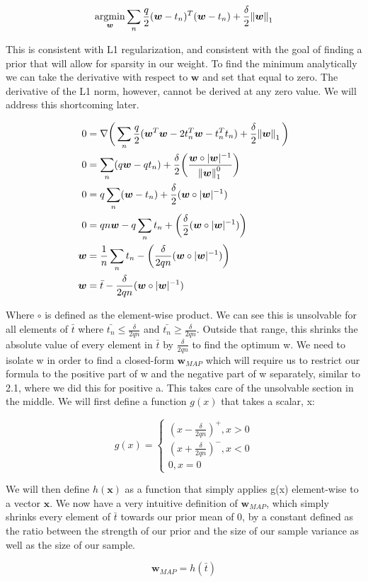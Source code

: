 \documentclass[a4paper,12pt]{article}
\DeclareMathOperator*{\argmin}{argmin}
\begin{document}
$$
\argmin_{\bm{w}} \sum_n \frac{q}{2}(\bm{w} - t_n)^{T}(\bm{w} - t_n) + \frac{\delta}{2} \norm{ \bm{w} }_1
$$

This is consistent with L1 regularization, and consistent with the goal of finding a prior that will allow for sparsity in our weight. To find the minimum analytically we can take the derivative with respect to $\bm{w}$ and set that equal to zero. The derivative of the L1 norm, however, cannot be derived at any zero value. We will address this shortcoming later.

\begin{align*}
0 &= \nabla \bigg(  \sum_n \frac{q}{2}(\bm{w}^T\bm{w} - 2t_n^T\bm{w} - t_n^Tt_n) + \frac{\delta}{2} \norm{ \bm{w} }_1  \bigg) \\
0 &=  \sum_n (q\bm{w} - qt_n) + \frac{\delta}{2} \bigg( \frac{\bm{w} \circ |\bm{w}|^{-1}}{ \norm{ \bm{w}}_1^{0} }  \bigg) \\ 
0 &=  q \sum_n (\bm{w} - t_n) + \frac{\delta}{2} ( \bm{w} \circ |\bm{w}|^{-1} ) \\
0 &=  qn\bm{w} - q\sum_n t_n + \bigg(\frac{\delta}{2} ( \bm{w} \circ |\bm{w}|^{-1} ) \bigg) \\
\bm{w} &=  \frac{1}{n} \sum_n t_n - \bigg( \frac{\delta}{2qn} ( \bm{w} \circ |\bm{w}|^{-1} ) \bigg) \\
  \bm{w} &=  \bar{t} - \frac{\delta}{2qn} ( \bm{w} \circ |\bm{w}|^{-1} )
\end{align*}

Where $\circ$ is defined as the element-wise product. We can see this is unsolvable for all elements of $\bar{t}$ where $\bar{t_n} \leq \frac{\delta}{2qn}$ and $\bar{t_n} \geq \frac{\delta}{2qn}$. Outside that range, this shrinks the absolute value of every element in $\bar{t}$ by $\frac{\delta}{2qn}$ to find the optimum w. We need to isolate w in order to find a closed-form $\bm{w}_{MAP}$ which will require us to restrict our formula to the positive part of w and the negative part of w separately, similar to 2.1, where we did this for positive a. This takes care of the unsolvable section in the middle. We will first define a function $ g(x) $ that takes a scalar, x:

$$
g(x) = 
\begin{cases}
  (x - \frac{\delta}{2qn})^+ , x > 0 \\
  (x + \frac{\delta}{2qn})^- , x < 0 \\
  0, x = 0
\end{cases}
$$

We will then define $h(\bm{x})$ as a function that simply applies g(x) element-wise to a vector $\bm{x}$. We now have a very intuitive definition of $\bm{w}_{MAP}$, which simply shrinks every element of $\bar{t}$ towards our prior mean of 0, by a constant defined as the ratio between the strength of our prior and the size of our sample variance as well as the size of our sample.

$$
  \bm{w}_{MAP} =  h(\bar{t})
$$
\end{document}
